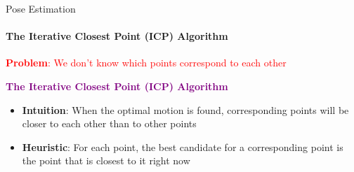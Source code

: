 \documentclass[aspectratio=169]{beamer}
\newcommand{\tikzRot}{0}
\newcommand{\tikzTrans}{(0,0)}
\newcommand{\tikzShowrobot}{0}
\begin{document}
\begin{frame}[fragile, t]{Pose Estimation}
	\framesubtitle{The Iterative Closest Point (ICP) Algorithm}
	\begin{minipage}{0.6\textwidth}

	\begin{block}{}
		\textcolor{red}{\textbf{Problem}: We don’t know which points correspond to each other}
	\end{block}

	\vspace{0.3in}

	\textcolor{purple}{\textbf{The Iterative Closest Point (ICP) Algorithm}}

    \begin{itemize}
        \item \textbf{Intuition}: When the optimal motion is found, corresponding points will be closer to each other than to other points
        \item  \textbf{Heuristic}: For each point, the best candidate for a corresponding point is the point that is closest to it right now
    \end{itemize}

\end{minipage}
\begin{minipage}{0.4\textwidth}
	\begin{figure}
		\renewcommand{\tikzRot}{40}
		\renewcommand{\tikzTrans}{(6,0)}
		\renewcommand{\tikzShowrobot}{1}
		\resizebox{0.8\textwidth}{!}{
		}
	\end{figure}
\end{minipage}
\end{frame}
\end{document}

